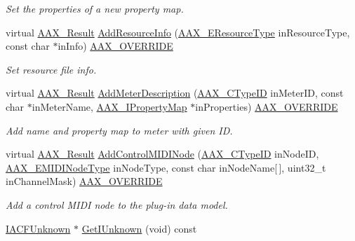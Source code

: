 \begin{DoxyCompactItemize}
\begin{DoxyCompactList}\small\item\em Set the properties of a new property map. \end{DoxyCompactList}\item 
virtual \hyperlink{a00149_a4d8f69a697df7f70c3a8e9b8ee130d2f}{A\+A\+X\+\_\+\+Result} \hyperlink{a00134_a1c2db6dc13c10fe65f194df064234faf}{Add\+Resource\+Info} (\hyperlink{a00206_ae2805e88175d975589153a04e42898bb}{A\+A\+X\+\_\+\+E\+Resource\+Type} in\+Resource\+Type, const char $\ast$in\+Info) \hyperlink{a00149_ac2f24a5172689ae684344abdcce55463}{A\+A\+X\+\_\+\+O\+V\+E\+R\+R\+I\+D\+E}
\begin{DoxyCompactList}\small\item\em Set resource file info. \end{DoxyCompactList}\item 
virtual \hyperlink{a00149_a4d8f69a697df7f70c3a8e9b8ee130d2f}{A\+A\+X\+\_\+\+Result} \hyperlink{a00134_ab5e64c4d12cf20f5a58e7c38da623f90}{Add\+Meter\+Description} (\hyperlink{a00149_ac678f9c1fbcc26315d209f71a147a175}{A\+A\+X\+\_\+\+C\+Type\+I\+D} in\+Meter\+I\+D, const char $\ast$in\+Meter\+Name, \hyperlink{a00112}{A\+A\+X\+\_\+\+I\+Property\+Map} $\ast$in\+Properties) \hyperlink{a00149_ac2f24a5172689ae684344abdcce55463}{A\+A\+X\+\_\+\+O\+V\+E\+R\+R\+I\+D\+E}
\begin{DoxyCompactList}\small\item\em Add name and property map to meter with given I\+D. \end{DoxyCompactList}\item 
virtual \hyperlink{a00149_a4d8f69a697df7f70c3a8e9b8ee130d2f}{A\+A\+X\+\_\+\+Result} \hyperlink{a00134_a73352021700dd10080c7b508b855b352}{Add\+Control\+M\+I\+D\+I\+Node} (\hyperlink{a00149_ac678f9c1fbcc26315d209f71a147a175}{A\+A\+X\+\_\+\+C\+Type\+I\+D} in\+Node\+I\+D, \hyperlink{a00206_a5e1dffce35d05990dbbad651702678e4}{A\+A\+X\+\_\+\+E\+M\+I\+D\+I\+Node\+Type} in\+Node\+Type, const char in\+Node\+Name\mbox{[}$\,$\mbox{]}, uint32\+\_\+t in\+Channel\+Mask) \hyperlink{a00149_ac2f24a5172689ae684344abdcce55463}{A\+A\+X\+\_\+\+O\+V\+E\+R\+R\+I\+D\+E}
\begin{DoxyCompactList}\small\item\em Add a control M\+I\+D\+I node to the plug-\/in data model. \end{DoxyCompactList}\item 
\hyperlink{a00146}{I\+A\+C\+F\+Unknown} $\ast$ \hyperlink{a00134_aa399a5892a5321ecc3842a23e6c575a2}{Get\+I\+Unknown} (void) const 
\end{DoxyCompactItemize}


